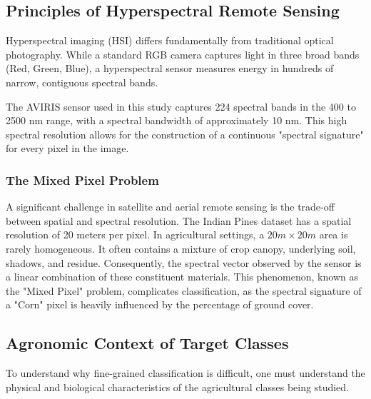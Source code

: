 \documentclass[conference]{IEEEtran}
\begin{document}
\subsection{Principles of Hyperspectral Remote Sensing}
Hyperspectral imaging (HSI) differs fundamentally from traditional optical photography. While a standard RGB camera captures light in three broad bands (Red, Green, Blue), a hyperspectral sensor measures energy in hundreds of narrow, contiguous spectral bands.

The AVIRIS sensor used in this study captures 224 spectral bands in the 400 to 2500 nm range, with a spectral bandwidth of approximately 10 nm. This high spectral resolution allows for the construction of a continuous "spectral signature" for every pixel in the image.

\subsubsection{The Mixed Pixel Problem}
A significant challenge in satellite and aerial remote sensing is the trade-off between spatial and spectral resolution. The Indian Pines dataset has a spatial resolution of 20 meters per pixel. In agricultural settings, a $20m \times 20m$ area is rarely homogeneous. It often contains a mixture of crop canopy, underlying soil, shadows, and residue. Consequently, the spectral vector observed by the sensor is a linear combination of these constituent materials. This phenomenon, known as the "Mixed Pixel" problem, complicates classification, as the spectral signature of a "Corn" pixel is heavily influenced by the percentage of ground cover.

\subsection{Agronomic Context of Target Classes}
To understand why fine-grained classification is difficult, one must understand the physical and biological characteristics of the agricultural classes being studied.
\end{document}
